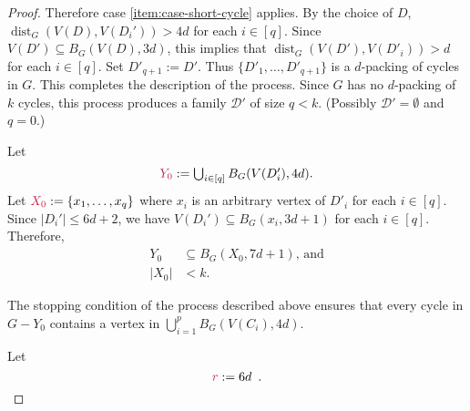 \documentclass{patmorin}
\DeclareMathOperator{\dist}{dist}
\begin{document}
\begin{proof}
   Therefore case \cref{item:case-short-cycle} applies.  By the choice of $D$,  
   $\dist_G(V(D),V(D_i'))>4d$ for each $i\in[q]$.  Since $V(D')\subseteq B_G(V(D),3d)$, this implies that $\dist_G(V(D'),V(D'_i))>d$ for each $i\in[q]$. Set $D'_{q+1}:=D'$. 
   Thus $\{D'_1,\ldots,D'_{q+1}\}$ is a $d$-packing of cycles in $G$.  
   This completes the description of the process.
   Since $G$ has no $d$-packing of $k$ cycles, this process produces a family $\mathcal{D'}$ of size $q<k$. 
   (Possibly $\mathcal{D'}=\emptyset$ and $q=0$.) 

   Let
   \[
        \textstyle\mathdefin{Y_0}:=\bigcup_{i\in[q]}B_G(V(D'_i),4d).
   \]
  Let $\mathdefin{X_0}:=\{x_1,\ldots,x_{q}\}$ where  $x_i$ is an arbitrary vertex of $D'_i$ for each $i\in[q]$. 
  Since $|D_i'|\leq 6d+2$, we have $V(D_i')\subseteq B_G(x_i,3d+1)$ for each $i\in[q]$. 
  Therefore, 
\begin{align}
  Y_0&\subseteq B_G(X_0,7d+1)\text{, and}\label{eq:M-contained-in-a-ball}\\
  |X_0|&< k.\label{eq:XM-size}
\end{align}

The stopping condition of the process described above ensures that 
every cycle in $G-Y_0$ contains a vertex in $\bigcup_{i=1}^p B_G(V(C_i),4d)$.

Let
\[
\mathdefin{r}:=6d\enspace .
\]


\end{proof}
\end{document}
